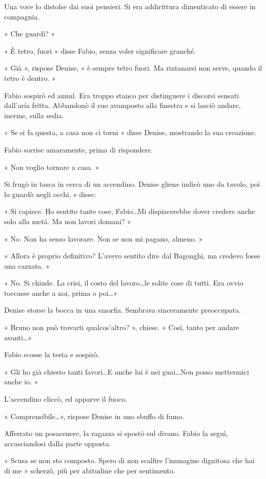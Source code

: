 Una voce lo distolse dai suoi pensieri. Si era addirittura dimenticato di essere in compagnia.

« Che guardi? »

« È tetro, fuori » disse Fabio, senza voler significare granché.

« Già », rispose Denise, « è sempre tetro fuori. Ma rintanarsi non serve, quando il tetro è dentro. »

Fabio sospirò ed annuì. Era troppo stanco per distinguere i discorsi sensati dall'aria fritta. Abbandonò il suo avamposto alla finestra e si lasciò andare, inerme, sulla sedia.

« Se si fa questa, a casa non ci torni » disse Denise, mostrando la sua creazione.

Fabio sorrise amaramente, prima di rispondere.

« Non voglio tornare a casa. »

Si frugò in tasca in cerca di un accendino. Denise gliene indicò uno da tavolo, poi lo guardò negli occhi, e disse:

« Si capisce. Ho sentito tante cose, Fabio\ldots Mi dispiacerebbe dover credere anche solo alla metà. Ma non lavori domani? »

« No. Non ha senso lavorare. Non se non mi pagano, almeno. »

« Allora è proprio definitivo? L'avevo sentito dire dal Bagonghi, ma credevo fosse una cazzata. »

« No. Si chiude. La crisi, il costo del lavoro\ldots le solite cose di tutti. Era ovvio toccasse anche a noi, prima o poi\ldots »

Denise storse la bocca in una smorfia. Sembrava sinceramente preoccupata.

« Bruno non può trovarti qualcos'altro? », chiese. « Così, tanto per andare avanti\ldots »

Fabio scosse la testa e sospirò.

« Gli ho già chiesto tanti favori\ldots E anche lui è nei guai\ldots Non posso mettermici anche io. »

L'accendino cliccò, ed apparve il fuoco.

« Comprensibile\ldots », rispose Denise in uno sbuffo di fumo.

Afferrato un posacenere, la ragazza si spostò sul divano. Fabio la seguì, accasciandosi dalla parte opposta.

« Scusa se non sto composto. Spero di non scalfire l'immagine dignitosa che hai di me » scherzò, più per abitudine che per sentimento.

